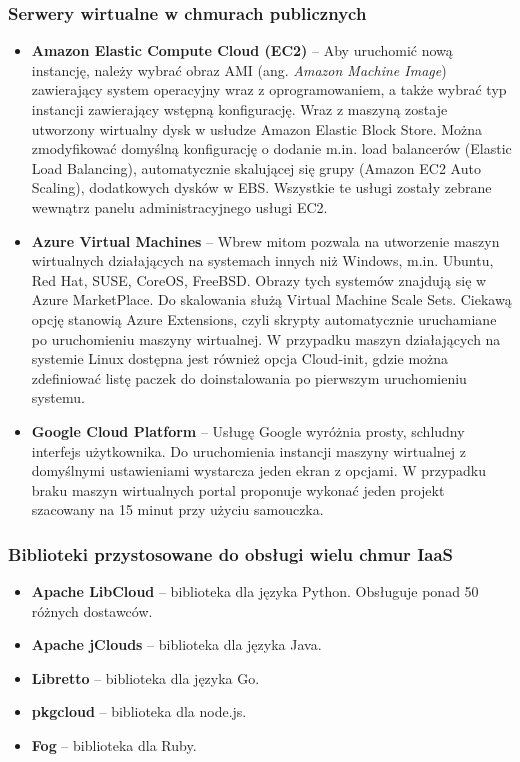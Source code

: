 \documentclass[12pt,a4paper,twoside,titlepage,openright]{book}
\begin{document}
\subsubsection*{Serwery wirtualne w chmurach publicznych}
\begin{itemize}
\item \textbf{Amazon Elastic Compute Cloud (EC2)} -- Aby uruchomić nową instancję, należy wybrać obraz AMI (ang. \textit{Amazon Machine Image}) zawierający system operacyjny wraz z oprogramowaniem, a także wybrać typ instancji zawierający wstępną konfigurację. Wraz z maszyną zostaje utworzony wirtualny dysk w usłudze Amazon Elastic Block Store. Można zmodyfikować domyślną konfigurację o dodanie m.in. load balancerów (Elastic Load Balancing), automatycznie skalującej się grupy (Amazon EC2 Auto Scaling), dodatkowych dysków w EBS. Wszystkie te usługi zostały zebrane wewnątrz panelu administracyjnego usługi EC2.
\item \textbf{Azure Virtual Machines} -- Wbrew mitom pozwala na utworzenie maszyn wirtualnych działających na systemach innych niż Windows, m.in. Ubuntu, Red Hat, SUSE, CoreOS, FreeBSD. Obrazy tych systemów znajdują się w Azure MarketPlace. Do skalowania służą Virtual Machine Scale Sets. Ciekawą opcję stanowią Azure Extensions, czyli skrypty automatycznie uruchamiane po uruchomieniu maszyny wirtualnej. W przypadku maszyn działających na systemie Linux dostępna jest również opcja Cloud-init, gdzie można zdefiniować listę paczek do doinstalowania po pierwszym uruchomieniu systemu. 
\item \textbf{Google Cloud Platform} -- Usługę Google wyróżnia prosty, schludny interfejs użytkownika. Do uruchomienia instancji maszyny wirtualnej z domyślnymi ustawieniami wystarcza jeden ekran z opcjami. W przypadku braku maszyn wirtualnych portal proponuje wykonać jeden projekt szacowany na 15 minut przy użyciu samouczka.
\end{itemize}

\subsubsection{Biblioteki przystosowane do obsługi wielu chmur IaaS}
\begin{itemize}
\item \textbf{Apache LibCloud} -- biblioteka dla języka Python. Obsługuje ponad 50 różnych dostawców.
\item \textbf{Apache jClouds} -- biblioteka dla języka Java. 
\item \textbf{Libretto} -- biblioteka dla języka Go.
\item \textbf{pkgcloud} -- biblioteka dla node.js.
\item \textbf{Fog} -- biblioteka dla Ruby.
\end{itemize}
\end{document}
